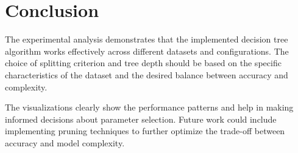 \documentclass[11pt]{article}
\begin{document}
\section{Conclusion}
The experimental analysis demonstrates that the implemented decision tree algorithm works effectively across different datasets and configurations. The choice of splitting criterion and tree depth should be based on the specific characteristics of the dataset and the desired balance between accuracy and complexity.

The visualizations clearly show the performance patterns and help in making informed decisions about parameter selection. Future work could include implementing pruning techniques to further optimize the trade-off between accuracy and model complexity.
\end{document}
